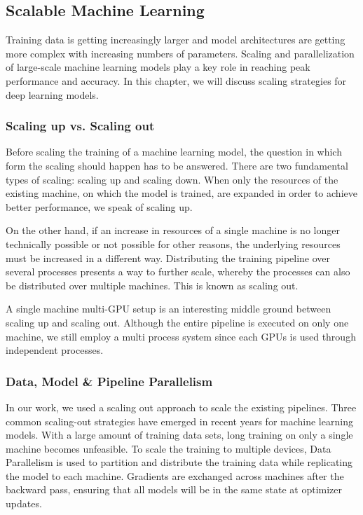 \subsection{Scalable Machine Learning}

Training data is getting increasingly larger and model architectures are getting more complex with increasing numbers 
of parameters. Scaling and parallelization of large-scale machine learning models play a key role in reaching peak 
performance and accuracy. In this chapter, we will discuss scaling strategies for deep learning models. 

\subsubsection{Scaling up vs. Scaling out}

Before scaling the training of a machine learning model, the question in which form the scaling should happen has to 
be answered. There are two fundamental types of scaling: scaling up and scaling down. When only the resources of the 
existing machine, on which the model is trained, are expanded in order to achieve better performance, we speak of 
scaling up.

On the other hand, if an increase in resources of a single machine is no longer technically possible or not possible for 
other reasons, the underlying resources must be increased in a different way. Distributing the training pipeline over 
several processes presents a way to further scale, whereby the processes can also be distributed over multiple machines. 
This is known as scaling out. 

A single machine multi-GPU setup is an interesting middle ground between scaling up and scaling out. Although the entire 
pipeline is executed on only one machine, we still employ a multi process system since each GPUs is used through 
independent processes.

\subsubsection{Data, Model & Pipeline Parallelism}

In our work, we used a scaling out approach to scale the existing pipelines. Three common scaling-out strategies have emerged 
 in recent years for machine learning models. With a large amount of training data sets, long training on only a single 
 machine becomes unfeasible. To scale the training to multiple devices, Data Parallelism is used to partition and distribute 
 the training data while replicating the model to each machine. Gradients are exchanged across machines after the backward 
 pass, ensuring that all models will be in the same state at optimizer updates. 

